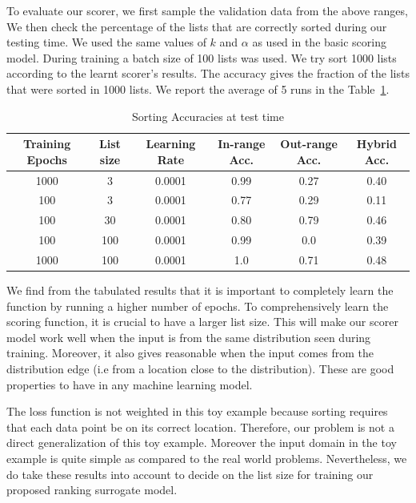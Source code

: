 \documentclass[12pt, twoside, ngerman]{report}
\begin{document}
To evaluate our scorer,  we first sample the validation data from the above ranges,
We then check the percentage of the lists that are correctly sorted during our testing time.
We used the same values of $k$ and $\alpha$ as used in the basic scoring model.
During training a batch size of 100 lists was used.
We try sort 1000 lists according to the learnt scorer's results.
The accuracy gives the fraction of the lists that were sorted in 1000 lists.
We report the average of 5 runs in the Table~\ref{table:caseStudyResults}.

\begin{table} [h!]
\centering
\resizebox{\linewidth}{!} {
\begin{tabular}{ | c | c | c | c | c | c | }
\hline
\textbf{Training Epochs} & \textbf{List size} & \textbf{Learning Rate} & \textbf{In-range Acc.} & \textbf{Out-range Acc.} & \textbf{Hybrid Acc.} \\ [0.5 ex]
\hline \hline
1000 & 3 & 0.0001 & 0.99 & 0.27 & 0.40\\
100 & 3 & 0.0001 & 0.77 & 0.29 & 0.11\\
100 & 30 & 0.0001 & 0.80 & 0.79 & 0.46\\
100 & 100 & 0.0001 & 0.99 & 0.0 & 0.39\\
1000 & 100 & 0.0001 & 1.0 & 0.71 & 0.48\\
\hline
\end{tabular}
}
\caption{Sorting Accuracies at test time}
\label {table:caseStudyResults}
\end{table}

We find from the tabulated results that it is important to completely learn the function by running a higher number of epochs.
To comprehensively learn the scoring function,  it is crucial to have a larger list size.
This will make our scorer model work well when the input is from the same distribution seen during training.
Moreover,  it also gives reasonable when the input comes from the distribution edge (i.e from a location close to the distribution).
These are good properties to have in any machine learning model.

The loss function is not weighted in this toy example because sorting requires that each data point be on its correct location.
Therefore,  our problem is not a direct generalization of this toy example.
Moreover the input domain in the toy example is quite simple as compared to the real world problems.
Nevertheless,  we do take these results into account to decide on the list size for training our proposed ranking surrogate model.
\end{document}
